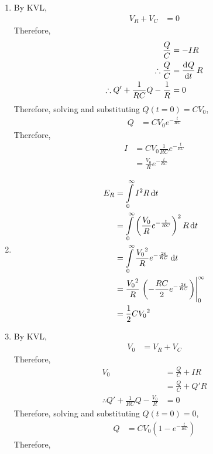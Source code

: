 \documentclass[fleqn, a4paper, 11pt, oneside]{amsart}
\theoremstyle{definition}
\theoremstyle{theorem}
\begin{document}
\begin{solution}
	\begin{enumerate}[leftmargin = *]
		\item
			By KVL,
			\begin{align*}
				V_R + V_C &= 0
			\end{align*}
			Therefore,
			\begin{align*}
				\frac{Q}{C} &= -I R\\
				\therefore \frac{Q}{C} &= \dod{Q}{t} R\\
				\therefore Q' + \frac{1}{R C} Q - \frac{1}{R} &= 0
			\end{align*}
			Therefore, solving and substituting $Q(t = 0) = C V_0$,
			\begin{align*}
				Q &= C V_0 e^{-\frac{t}{R C}}
			\end{align*}
			Therefore,
			\begin{align*}
				I &= C V_0 \frac{1}{R C} e^{-\frac{t}{R C}}\\
				&= \frac{V_0}{R} e^{-\frac{t}{R C}}
			\end{align*}
		\item
			\begin{align*}
				E_R &= \int\limits_{0}^{\infty} I^2 R \dif t\\
				&= \int\limits_{0}^{\infty} \left( \frac{V_0}{R} e^{-\frac{t}{R C}} \right)^2 R \dif t\\
				&= \int\limits_{0}^{\infty} \frac{{V_0}^2}{R} e^{-\frac{2 t}{R C}} \dif t\\
				&= \frac{{V_0}^2}{R} \left. \left( -\frac{R C}{2} e^{-\frac{2 t}{R C}} \right) \right|_{0}^{\infty}\\
				&= \frac{1}{2} C {V_0}^2
			\end{align*}
		\item
			By KVL,
			\begin{align*}
				V_0 &= V_R + V_C
			\end{align*}
			Therefore,
			\begin{align*}
				V_0 &= \frac{Q}{C} + I R\\
				&= \frac{Q}{C} + Q' R\\
				\therefore Q' + \frac{1}{R C} Q - \frac{V_0}{R} &= 0
			\end{align*}
			Therefore, solving and substituting $Q(t = 0) = 0$,
			\begin{align*}
				Q &= C V_0 \left( 1 - e^{-\frac{t}{R C}} \right)
			\end{align*}
			Therefore,
			\begin{align*}

\end{align*}
\end{enumerate}
\end{solution}
\end{document}
